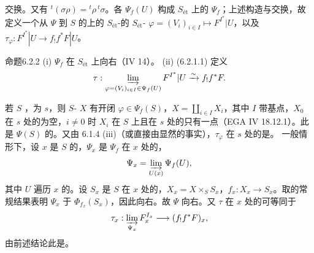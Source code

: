 交换。又有 ${}^t(\sigma\rho)={}^t\rho\,{}^t\sigma$。各 $\Psi_f(U)$ 构成 $S_{\text{ét}}$ 上的 $\Psi_f$；上述构造与交换，故定义一个从 $\Psi$ 到 $S$ 的上的 $S_{\text{ét}}$-的 $S_{\text{ét}}$- $\varphi=(V_i)_{i\in I}\mapsto F^{I^*}|U$，以及 $\tau_\varphi:F^{I^*}|U\to f_!f^*F|U$。
\begin{SGAresult}{命题}{6.2.2}
(i)  $\Psi_f$ 在 $S_{\text{ét}}$ 上向右（IV 14）。
(ii)  (6.2.1.1) 定义
\[\tau:\varinjlim_{\varphi=(V_i)_{i\in I}\in\Psi_f(U)}F^{I^*}|U\xrightarrow{\sim}f_!f^*F.\]
\end{SGAresult}
若 $S$ ，为 $s$，则 $S$- $X$ 有开闭 $\varphi\in\Psi_f(S)$，$X=\coprod_{i\in I}X_i$，其中 $I$ 带基点，$X_0$ 在 $s$ 处的为空，$i\ne0$ 时 $X_i$ 在 $S$ 上且在 $s$ 处的只有一点（EGA IV 18.12.1）。此是 $\Psi(S)$ 的。又由 6.1.4 (iii)（或直接由显然的事实），$\tau_\varphi$ 在 $s$ 处的是。
一般情形下，设 $x$ 是 $S$ 的，$\Psi_x$ 是 $\Psi_f$ 在 $x$ 处的，
\[\Psi_x=\varinjlim_{U(x)}\Psi_f(U),\]
其中 $U$ 遍历 $x$ 的。设 $S_x$ 是 $S$ 在 $x$ 处的，$X_x=X\times_S S_x$，$f_x:X_x\to S_x$。取的常规结果表明 $\Psi_x$ 于 $\Phi_{f_x}(S_x)$，因此向右。故 $\Psi$ 向右。又 $\tau$ 在 $x$ 处的可等同于
\[\tau_x:\varinjlim_{\Psi_x}F_x^{I_x}\longrightarrow(f_!f^*F)_x,\]
由前述结论此是。
